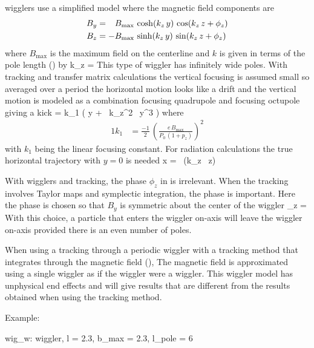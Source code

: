 { wigglers use a simplified model where the magnetic
field components are
\begin{alignat}{1}
  B_y &= \hphantom{-} B_{\max} \, \cosh(k_z \, y) \, \cos(k_z \, z + \phi_z) \nonumber \\
  B_z &= -B_{\max} \, \sinh(k_z \, y) \, \sin(k_z \, z + \phi_z) 
  \label{bbkykz}
\end{alignat}
where $B_{\max}$ is the maximum field on the centerline and $k$ is
given in terms of the pole length () by
\Begineq
  k_z = 
\Endeq
This type of wiggler has infinitely wide poles. With
 tracking and transfer matrix calculations the
vertical focusing is assumed small so averaged over a period the
horizontal motion looks like a drift and the vertical motion is
modeled as a combination focusing quadrupole and focusing octupole
giving a kick\cite{b:corbett}
\Begineq
   = k_1 \left( y +  \, k_z^2 \, y^3 \right)
\Endeq
where
\begin{alignat}{1}
  k_1 &= \frac{-1}{2} \, \left( \frac{e \, B_{\max}}{P_0 \, (1 + p_z)} \right)^2 
\end{alignat}
with $k_1$ being the linear focusing constant. For radiation
calculations the true horizontal trajectory with $y = 0$ is needed
\Begineq
  x =  \, \cos (k_z \, z)
\Endeq

With  wigglers and  tracking, the
phase $\phi_z$ in  is irrelevant. When the tracking
involves Taylor maps and symplectic integration, the phase is
important. Here the phase is chosen so that $B_y$ is symmetric about
the center of the wiggler
\Begineq
  \phi_z = 
\Endeq
With this choice, a particle that enters the wiggler on-axis will
leave the wiggler on-axis provided there is an even number of poles.

When using a tracking through a periodic wiggler with a tracking
method that integrates through the magnetic field (),
The magnetic field is approximated using a single wiggler  as
if the wiggler were a  wiggler. This wiggler model has
unphysical end effects and will give results that are different from
the results obtained when using the  tracking
method. 

Example:
\begin{example}
  wig_w: wiggler, l = 2.3, b_max = 2.3, l_pole = 6
\end{example}

}
